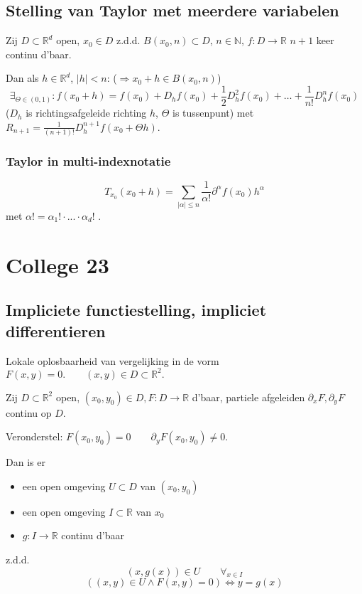 \documentclass[a4paper]{exam}
\theoremstyle{definition}
\newcommand{\naturals}{\mathbb{N}}
\newcommand{\reals}{\mathbb{R}}
\begin{document}
	\subsection{Stelling van Taylor met meerdere variabelen}
	\theorem Zij  $D \subset \reals^d$ open, $x_0 \in D$ z.d.d. $B(x_0,n) \subset D$, $n\in \naturals$, $f:D\to \reals$ $n+1$ keer continu d'baar.
	
	Dan als $h \in \reals^d$, $ |h|<n $: ($\Rightarrow x_0+h \in B(x_0,n)$)
	\[ \exists_{\Theta \in (0,1)}:f(x_0+h) = f(x_0) + D_h f(x_0) + \frac{1}{2} D_h^2 f(x_0) + \dots + \frac{1}{n!} D_h^n f(x_0) \]
	($D_h$ is richtingsafgeleide richting $h$, $\Theta$ is tussenpunt)
	met $R_{n+1} = \frac{1}{(n+1)!}D_h^{n+1} f(x_0 + \Theta h)$.
	
	\subsubsection{Taylor in multi-indexnotatie}
	\[ T_{x_0} (x_0 + h) = \sum_{|\alpha|\le n} \frac{1}{\alpha !} \partial^\alpha f(x_0)h^\alpha \] met $ \alpha ! = \alpha_1 ! \cdot ... \cdot \alpha_d !$ .
	
	\newpage
	\section{College 23}
	\subsection{Impliciete functiestelling, impliciet differentieren}
	Lokale oplosbaarheid van vergelijking in de vorm $ F(x,y)=0. \qquad (x,y) \in D \subset \reals^2. $
	
	 Zij $D \subset \reals^2$ open, $ (x_0 , y_0 ) \in D, F:D \rightarrow \reals $ d'baar, partiele afgeleiden $ \partial_x F, \partial_y F $ continu op $ D $.
	
	Veronderstel: $ F(x_0, y_0) = 0 \qquad \partial_y F(x_0, y_0)\neq 0 $.
	
	Dan is er 
	\begin{itemize} 
		\item[] een open omgeving $ U \subset D $ van $ (x_0,y_0) $
		\item[] een open omgeving $ I \subset \reals $ van $ x_0 $
		\item[] $ g: I \rightarrow \reals $ continu d'baar 
	\end{itemize}
	z.d.d.
	\[ (x,g(x)) \in U \qquad \forall_{x \in I} \]
	\[ ((x,y) \in U \wedge F(x,y)=0) \Leftrightarrow y=g(x) \]
	
\end{document}
